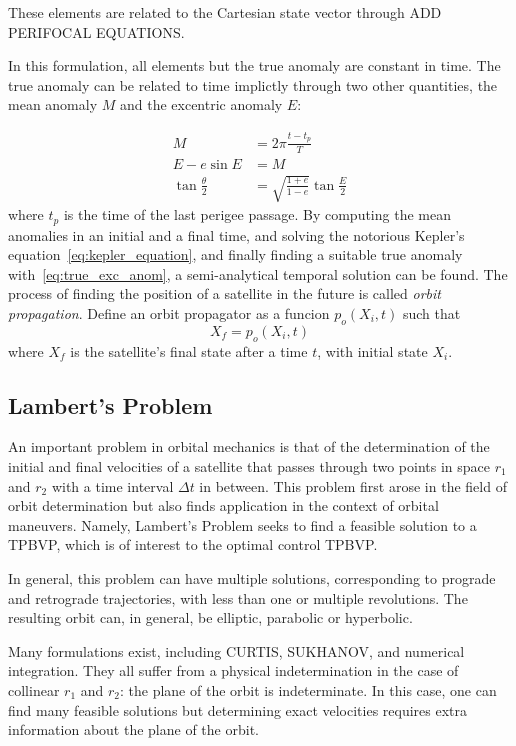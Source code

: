 These elements are related to the Cartesian state vector through ADD PERIFOCAL EQUATIONS.

In this formulation, all elements but the true anomaly are constant in time. The true anomaly can be related to time implictly through two other quantities, the mean anomaly \(M\) and the excentric anomaly \(E\):

\begin{align} 
        M &= 2\pi \frac{t - t_p}{T} \\
        E - e \sin{E} &= M \label{eq:kepler_equation}\\
        \tan{\frac{\theta}{2}} &= \sqrt{\frac{1+e}{1-e}} \tan{\frac{E}{2}} \label{eq:true_exc_anom}
\end{align}
where \(t_p\) is the time of the last perigee passage. By computing the mean anomalies in an initial and a final time, and solving the notorious Kepler's equation~\eqref{eq:kepler_equation}, and finally finding a suitable true anomaly with~\eqref{eq:true_exc_anom}, a semi-analytical temporal solution can be found. The process of finding the position of a satellite in the future is called \textit{orbit propagation}. Define an orbit propagator as a funcion \(p_o(X_i, t)\) such that
\begin{equation}
    X_f = p_o(X_i, t)
\end{equation}
where \(X_f\) is the satellite's final state after a time \(t\), with initial state \(X_i\).

\subsection{Lambert's Problem}

An important problem in orbital mechanics is that of the determination of the initial and final velocities of a satellite that passes through two points in space \(r_1\) and \(r_2\) with a time interval \(\Delta t\) in between. This problem first arose in the field of orbit determination but also finds application in the context of orbital maneuvers. Namely, Lambert's Problem seeks to find a feasible solution to a TPBVP, which is of interest to the optimal control TPBVP.

In general, this problem can have multiple solutions, corresponding to prograde and retrograde trajectories, with less than one or multiple revolutions. The resulting orbit can, in general, be elliptic, parabolic or hyperbolic. 

Many formulations exist, including CURTIS, SUKHANOV, and numerical integration. They all suffer from a physical indetermination in the case of collinear \(r_1\) and \(r_2\): the plane of the orbit is indeterminate. In this case, one can find many feasible solutions but determining exact velocities requires extra information about the plane of the orbit.\

